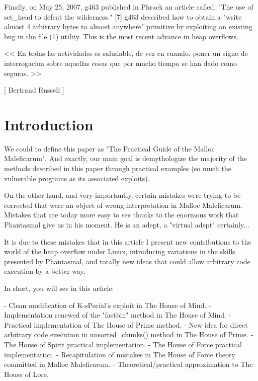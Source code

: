 \documentclass[12pt]{article}
\begin{document}
Finally, on May 25, 2007, g463 published in Phrack an article called:
"The use of set\_head to defeat the wilderness." [7] g463 described how to
obtain a "write almost 4 arbitrary bytes to almost anywhere" primitive
by exploiting an existing bug in the file (1) utility. This is the most
recent advance in heap overflows.
\newline

\begin{verbnobox}[\small]
              << En todas las actividades es saludable, de vez
                 en cuando, poner un signo de interrogacion
                 sobre aquellas cosas que por mucho tiempo se
                 han dado como seguras. >>

                                          [ Bertrand Russell ]
\end{verbnobox}


\section{Introduction}



We could to define this paper as "The Practical Guide of the Malloc 
Maleficarum". And exactly, our main goal is demythologize the majority
of the methods described in this paper through practical examples (so
much the vulnerable programs as its associated exploits).
\newline

On the other hand, and very importantly, certain mistakes were trying to
be corrected that were an object of wrong interpretation in Malloc
Maleficarum. Mistakes that are today more easy to see thanks to the
enormous work that Phantasmal give us in his moment. He is an adept, a
"virtual adept" certainly...
\newline

It is due to these mistakes that in this article I present new
contributions to the world of the heap overflow under Linux, introducing
variations in the skills presented by Phantasmal, and totally new ideas
that could allow arbitrary code execution by a better way.
\newline

In short, you will see in this article:
\newline

 - Clean modification of K-sPecial's exploit in The House of Mind.\newline
 - Implementation renewed of the "fastbin" method in The House of Mind.\newline
 - Practical implementation of The House of Prime method.\newline
 - New idea for direct arbitrary code execution in unsorted\_chunks() method in The House of Prime.\newline
 - The House of Spirit practical implementation.\newline
 - The House of Force practical implementation.\newline
 - Recapitulation of mistakes in The House of Force theory committed in
   Malloc Maleficarum.\newline
 - Theoretical/practical approximation to The House of Lore.\newline
 
\end{document}
